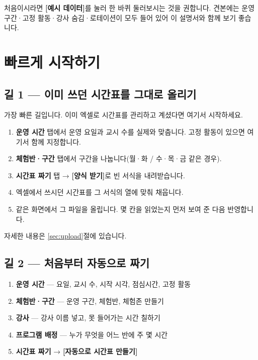 \documentclass[11pt,a4paper]{article}
\newcommand{\btn}[1]{\textcolor{ttdark}{\sffamily\bfseries[#1]}}   %
\newcommand{\tab}[1]{\textcolor{ttblue}{\sffamily\bfseries#1}}      %
\begin{document}
\begin{tip}
처음이시라면 \btn{예시 데이터}를 눌러 한 바퀴 둘러보시는 것을 권합니다.
견본에는 운영 구간·고정 활동·강사 숨김·로테이션이 모두 들어 있어 이 설명서와 함께 보기 좋습니다.
\end{tip}

\section{빠르게 시작하기}

\subsection{길 1 — 이미 쓰던 시간표를 그대로 올리기}

가장 빠른 길입니다. 이미 엑셀로 시간표를 관리하고 계셨다면 여기서 시작하세요.

\begin{enumerate}
  \item \tab{운영 시간} 탭에서 운영 요일과 교시 수를 실제와 맞춥니다. 고정 활동이 있으면 여기서 함께 지정합니다.
  \item \tab{체험반·구간} 탭에서 구간을 나눕니다(월·화 / 수·목·금 같은 경우).
  \item \tab{시간표 짜기} 탭 → \btn{양식 받기}로 빈 서식을 내려받습니다.
  \item 엑셀에서 쓰시던 시간표를 그 서식의 열에 맞춰 채웁니다.
  \item 같은 화면에서 그 파일을 올립니다. 몇 칸을 읽었는지 먼저 보여 준 다음 반영합니다.
\end{enumerate}

자세한 내용은 \ref{sec:upload}절에 있습니다.

\subsection{길 2 — 처음부터 자동으로 짜기}

\begin{enumerate}
  \item \tab{운영 시간} — 요일, 교시 수, 시작 시각, 점심시간, 고정 활동
  \item \tab{체험반·구간} — 운영 구간, 체험반, 체험존 만들기
  \item \tab{강사} — 강사 이름 넣고, 못 들어가는 시간 칠하기
  \item \tab{프로그램 배정} — 누가 무엇을 어느 반에 주 몇 시간
  \item \tab{시간표 짜기} → \btn{자동으로 시간표 만들기}
\end{enumerate}
\end{document}
